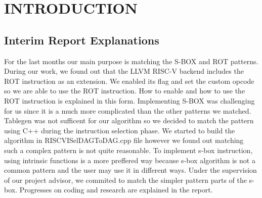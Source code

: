 \chapter{INTRODUCTION}\label{Ch1}


\section{Interim Report Explanations}\label{plan}


For the last months our main purpose is matching the S-BOX and ROT patterns. During our work, we found out that the LLVM RISC-V backend includes the ROT instruction as an extension. We enabled its flag and set the custom opcode so we are able to use the ROT instruction. How to enable and how to use the ROT instruction is explained in this form. Implementing S-BOX was challenging for us since it is a much more complicated than the other patterns we matched. Tablegen was not sufficent for our algorithm so we decided to match the pattern using C++ during the instruction selection phase. We started to build the algorithm in RISCVISelDAGToDAG.cpp file however we found out matching such a complex pattern is not quite reasonable. To implement s-box instruction, using intrinsic functions is a more preffered way because s-box algorithm is not a common pattern and the user may use it in different ways. Under the supervision of our project advisor, we commited to match the simpler pattern parts of the s-box. Progresses on coding and research are explained in the report.
